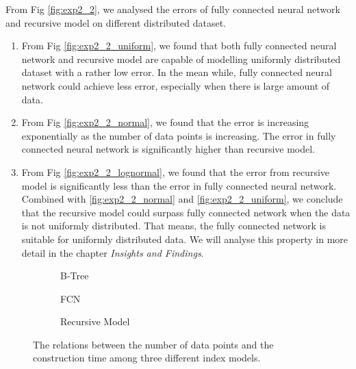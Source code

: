 \begin{mscconclusion}
	From Fig \ref{fig:exp2_2}, we analysed the errors of fully connected neural network and recursive model on different distributed dataset.
	\begin{enumerate}
		\item From Fig \ref{fig:exp2_2_uniform}, we found that both fully connected neural network and recursive model are capable of modelling uniformly distributed dataset with a rather low error. In the mean while, fully connected neural network could achieve less error, especially when there is large amount of data.		\item From Fig \ref{fig:exp2_2_normal}, we found that the error is increasing exponentially as the number of data points is increasing. The error in fully connected neural network is significantly higher than recursive model.
		\item From Fig \ref{fig:exp2_2_lognormal}, we found that the error from recursive model is significantly less than the error in fully connected neural network. Combined with \ref{fig:exp2_2_normal} and \ref{fig:exp2_2_uniform}, we conclude that the recursive model could surpass fully connected network when the data is not uniformly distributed. That means, the fully connected network is suitable for uniformly distributed data. We will analyse this property in more detail in the chapter \textit{Insights and Findings}.
	\end{enumerate}
\end{mscconclusion}

\begin{figure}
 \centering
     \begin{subfigure}[b]{0.3\textwidth}
         \centering
         
         \caption{B-Tree}
         \label{fig:exp2_3_btree}
     \end{subfigure}
     \hfill
     \begin{subfigure}[b]{0.3\textwidth}
         \centering
         
         \caption{FCN}
         \label{fig:exp2_3_fcn}
     \end{subfigure}
     \hfill
     \begin{subfigure}[b]{0.3\textwidth}
         \centering
         
         \caption{Recursive Model}
         \label{fig:exp2_3_rmi}
     \end{subfigure}
        \caption{The relations between the number of data points and the construction time among three different index models.}
        \label{fig:exp2_3}
\end{figure}

